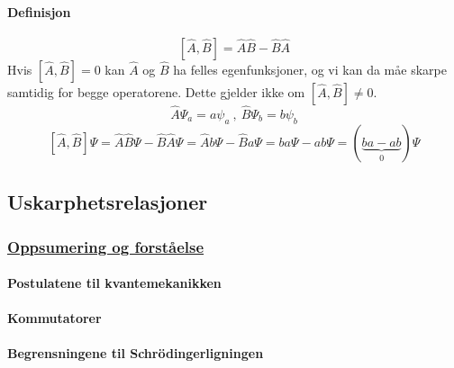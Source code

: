 \paragraph*{Definisjon}
\[
\left[\hat{A}, \hat{B}\right] = \hat{A}\hat{B} - \hat{B}\hat{A}
\]
Hvis $\left[\hat{A}, \hat{B}\right] = 0$ kan $\hat{A}$ og $\hat{B}$ ha felles egenfunksjoner, og vi kan da måe skarpe samtidig for begge operatorene. Dette gjelder ikke om $\left[\hat{A}, \hat{B}\right] \neq 0$.
\[
\hat{A}Ψ_a = a ψ_a \ , \ \hat{B}Ψ_b = b ψ_b
\]
\[
\left[\hat{A}, \hat{B}\right] Ψ = \hat{A} \hat{B} Ψ - \hat{B}\hat{A}Ψ = \hat{A}bΨ - \hat{B}aΨ = baΨ - abΨ = (\underbrace{ba-ab}_{0})Ψ 
\]
\subsection{Uskarphetsrelasjoner}


\subsubsection{\underline{Oppsumering og forståelse}}
\paragraph*{Postulatene til kvantemekanikken}
\paragraph*{Kommutatorer}
\paragraph*{Begrensningene til Schrödingerligningen}